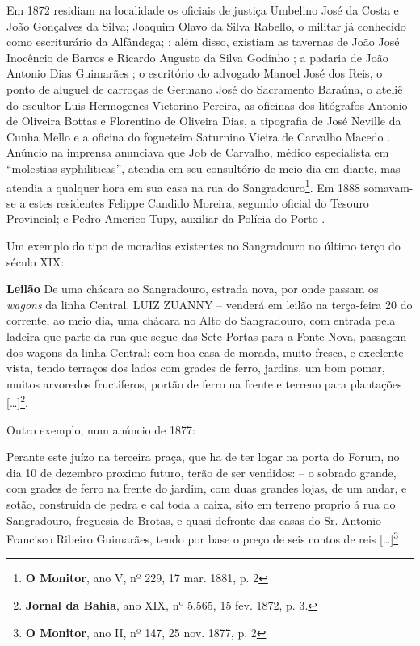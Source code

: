 Em 1872 residiam na localidade os oficiais de justiça Umbelino José da Costa e João Gonçalves da Silva; Joaquim Olavo da Silva Rabello, o militar já conhecido como escriturário da Alfândega; \cite[segunda~parte, pp.~60, 128, 167]{pimenta_almanak_1872}; além disso, existiam as tavernas de João José Inocêncio de Barros e Ricardo Augusto da Silva Godinho \cite[terceira parte, pp.~43, 49]{pimenta_almanak_1872}; a padaria de João Antonio Dias Guimarães \cite[terceira parte, p.~52]{pimenta_almanak_1872}; o escritório do advogado Manoel José dos Reis, o ponto de aluguel de carroças de Germano José do Sacramento Baraúna, o ateliê do escultor Luis Hermogenes Victorino Pereira, as oficinas dos litógrafos Antonio de Oliveira Bottas e Florentino de Oliveira Dias, a tipografia de José Neville da Cunha Mello e a oficina do fogueteiro Saturnino Vieira de Carvalho Macedo \cite[quarta parte, pp.~2, 20, 35, 36, 38 43]{pimenta_almanak_1872}. Anúncio na imprensa anunciava que Job de Carvalho, médico especialista em ``molestias syphiliticas'', atendia em seu consultório de meio dia em diante, mas atendia a qualquer hora em sua casa na rua do Sangradouro\footnote{\textbf{O Monitor}, ano V, nº 229, 17 mar. 1881, p. 2}. Em 1888 somavam-se a estes residentes Felippe Candido Moreira, segundo oficial do Tesouro Provincial; e Pedro Americo Tupy, auxiliar da Polícia do Porto \cite[pp.~18, 30]{carvalho_almanach_1888}. 

Um exemplo do tipo de moradias existentes no Sangradouro no último terço do século XIX:

\begin{citacao}
\textbf{Leilão}
De uma chácara ao Sangradouro, estrada nova, por onde passam os \textit{wagons} da linha Central.
LUIZ ZUANNY -- venderá em leilão na terça-feira 20 do corrente, ao meio dia, uma chácara no Alto do Sangradouro, com entrada pela ladeira que parte da rua que segue das Sete Portas para a Fonte Nova, passagem dos wagons da linha Central; com boa casa de morada, muito fresca, e excelente vista, tendo terraços dos lados com grades de ferro, jardins, um bom pomar, muitos arvoredos fructiferos, portão de ferro na frente e terreno para plantações [\dots]\footnote{\textbf{Jornal da Bahia}, ano XIX, nº 5.565, 15 fev. 1872, p. 3.}.
\end{citacao}

Outro exemplo, num anúncio de 1877:

\begin{citacao}
Perante este juízo na terceira praça, que ha de ter logar na porta do Forum, no dia 10 de dezembro proximo futuro, terão de ser vendidos: -- o sobrado grande, com grades de ferro na frente do jardim, com duas grandes lojas, de um andar, e sotão, construida de pedra e cal toda a caixa, sito em terreno proprio á rua do Sangradouro, freguesia de Brotas, e quasi defronte das casas do Sr. Antonio Francisco Ribeiro Guimarães, tendo por base o preço de seis contos de reis [\dots]\footnote{\textbf{O Monitor}, ano II, nº 147, 25 nov. 1877, p. 2}
\end{citacao}

